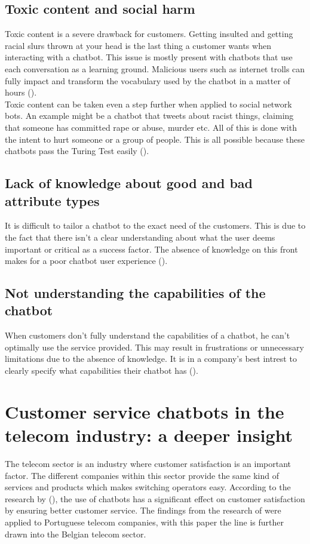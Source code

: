 \subsection{Toxic content and social harm}
Toxic content is a severe drawback for customers. Getting insulted and getting racial slurs thrown at your head is the last thing a customer wants when interacting with a chatbot. This issue is mostly present with chatbots that use each conversation as a learning ground. Malicious users such as internet trolls can fully impact and transform the vocabulary used by the chatbot in a matter of hours (\cite{Adamopoulou2020}).\\
\break
Toxic content can be taken even a step further when applied to social network bots. An example might be a chatbot that tweets about racist things, claiming that someone has committed rape or abuse, murder etc. All of this is done with the intent to hurt someone or a group of people. This is all possible because these chatbots pass the Turing Test easily (\cite{Radziwil2021}).

\subsection{Lack of knowledge about good and bad attribute types}
It is difficult to tailor a chatbot to the exact need of the customers. This is due to the fact that there isn't a clear understanding about what the user deems important or critical as a success factor. The absence of knowledge on this front makes for a poor chatbot user experience (\cite{brandtzaeg2020}).

\subsection{Not understanding the capabilities of the chatbot}
When customers don't fully understand the capabilities of a chatbot, he can't optimally use the service provided. This may result in frustrations or unnecessary limitations due to the absence of knowledge. It is in a company's best intrest to clearly specify what capabilities their chatbot has (\cite{brandtzaeg2020}).

\section{Customer service chatbots in the telecom industry: a deeper insight}
The telecom sector is an industry where customer satisfaction is an important factor. The different companies within this sector provide the same kind of services and products which makes switching operators easy. According to the research by (\cite{Quintino2019}), the use of chatbots has a significant effect on customer satisfaction by ensuring better customer service. The findings from the research of \citeauthor{Quintino1019} were applied to Portuguese telecom companies, with this paper the line is further drawn into the Belgian telecom sector.\\
